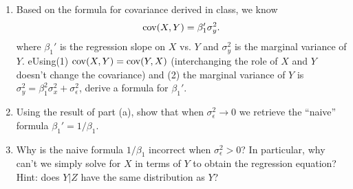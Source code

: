\begin{exercise}
\begin{enumerate}[label=(\alph*)]
\item Based on the formula for covariance derived in class, we know 
\begin{equation*}
{\rm cov}(X,Y)  =\beta_1'\sigma_y^2.
\end{equation*}
where $\beta_1'$ is the regression slope on $X$ vs. $Y$ and $\sigma_y^2$ is the marginal variance of $Y$.  
eUsing(1)  ${\rm cov}(X,Y) = {\rm cov}(Y,X)$ (interchanging the role of $X$ and $Y$ doesn't change the covariance) and (2) the marginal variance of $Y$ is $\sigma_y^2 = \beta_1^2\sigma_x^2 + \sigma_{\epsilon}^2$, derive a formula for $\beta_1'$. 
\item Using the result of part (a), show that when $\sigma_{\epsilon}^2 \to 0$ we retrieve the ``naive'' formula $\beta_1' = 1/\beta_1$. 
\item Why is the naive formula $1/\beta_1$ incorrect when $\sigma_{\epsilon}^2>0$? In particular, why can't we simply solve for $X$ in terms of $Y$ to obtain the regression equation? Hint: does $Y|Z$ have the same distribution as $Y$? 
\end{enumerate}
\end{exercise}







